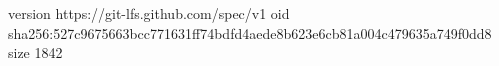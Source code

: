 version https://git-lfs.github.com/spec/v1
oid sha256:527c9675663bcc771631ff74bdfd4aede8b623e6cb81a004c479635a749f0dd8
size 1842
